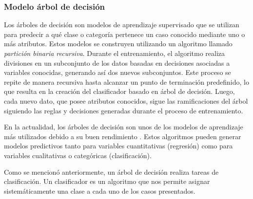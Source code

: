 \subsubsection{Modelo árbol de decisión}
Los árboles de decisión son modelos de aprendizaje supervisado que se utilizan para predecir a qué clase o categoría pertenece un caso conocido mediante uno o más atributos. Estos modelos se construyen utilizando un algoritmo llamado \emph{partición binaria recursiva}. Durante el entrenamiento, el algoritmo realiza divisiones en un subconjunto de los datos basadas en decisiones asociadas a variables conocidas, generando así dos nuevos subconjuntos. Este proceso se repite de manera recursiva hasta alcanzar un punto de terminación predefinido, lo que resulta en la creación del clasificador basado en árbol de decisión. Luego, cada nuevo dato, que posee atributos conocidos, sigue las ramificaciones del árbol siguiendo las reglas y decisiones generadas durante el proceso de entrenamiento.

En la actualidad, los árboles de decisión son unos de los modelos de aprendizaje más utilizados debido a su buen rendimiento \cite{arboles-decision}. Estos algoritmos pueden generar modelos predictivos tanto para variables cuantitativas (regresión) como para variables cualitativas o categóricas (clasificación).

Como se mencionó anteriormente, un árbol de decisión realiza tareas de clasificación. Un clasificador es un algoritmo que nos permite asignar sistemáticamente una clase a cada uno de los casos presentados.

